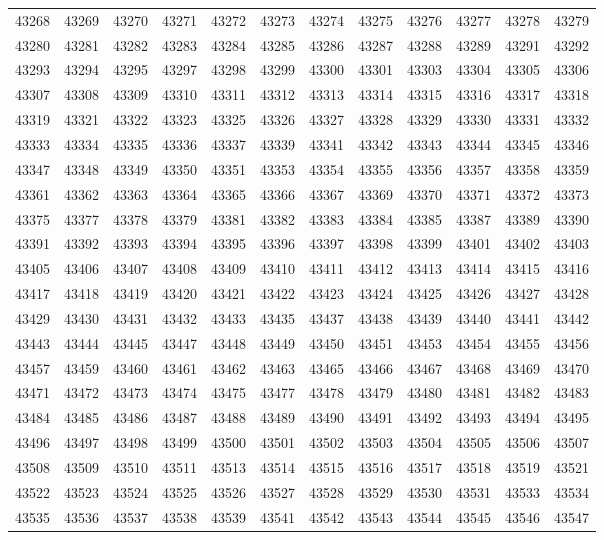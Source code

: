\begin{center}
\begin{longtable}{llllllllllll}
43268 &43269 &43270 &43271 &43272 &43273 &43274 &43275 &43276 &43277 &43278 &43279 \\
43280 &43281 &43282 &43283 &43284 &43285 &43286 &43287 &43288 &43289 &43291 &43292 \\
43293 &43294 &43295 &43297 &43298 &43299 &43300 &43301 &43303 &43304 &43305 &43306 \\
43307 &43308 &43309 &43310 &43311 &43312 &43313 &43314 &43315 &43316 &43317 &43318 \\
43319 &43321 &43322 &43323 &43325 &43326 &43327 &43328 &43329 &43330 &43331 &43332 \\
43333 &43334 &43335 &43336 &43337 &43339 &43341 &43342 &43343 &43344 &43345 &43346 \\
43347 &43348 &43349 &43350 &43351 &43353 &43354 &43355 &43356 &43357 &43358 &43359 \\
43361 &43362 &43363 &43364 &43365 &43366 &43367 &43369 &43370 &43371 &43372 &43373 \\
43375 &43377 &43378 &43379 &43381 &43382 &43383 &43384 &43385 &43387 &43389 &43390 \\
43391 &43392 &43393 &43394 &43395 &43396 &43397 &43398 &43399 &43401 &43402 &43403 \\
43405 &43406 &43407 &43408 &43409 &43410 &43411 &43412 &43413 &43414 &43415 &43416 \\
43417 &43418 &43419 &43420 &43421 &43422 &43423 &43424 &43425 &43426 &43427 &43428 \\
43429 &43430 &43431 &43432 &43433 &43435 &43437 &43438 &43439 &43440 &43441 &43442 \\
43443 &43444 &43445 &43447 &43448 &43449 &43450 &43451 &43453 &43454 &43455 &43456 \\
43457 &43459 &43460 &43461 &43462 &43463 &43465 &43466 &43467 &43468 &43469 &43470 \\
43471 &43472 &43473 &43474 &43475 &43477 &43478 &43479 &43480 &43481 &43482 &43483 \\
43484 &43485 &43486 &43487 &43488 &43489 &43490 &43491 &43492 &43493 &43494 &43495 \\
43496 &43497 &43498 &43499 &43500 &43501 &43502 &43503 &43504 &43505 &43506 &43507 \\
43508 &43509 &43510 &43511 &43513 &43514 &43515 &43516 &43517 &43518 &43519 &43521 \\
43522 &43523 &43524 &43525 &43526 &43527 &43528 &43529 &43530 &43531 &43533 &43534 \\
43535 &43536 &43537 &43538 &43539 &43541 &43542 &43543 &43544 &43545 &43546 &43547 \\

\end{longtable}
\end{center}
